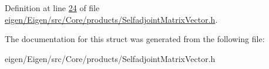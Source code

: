 Definition at line \hyperlink{eigen_2_eigen_2src_2_core_2products_2_selfadjoint_matrix_vector_8h_source_l00024}{24} of file \hyperlink{eigen_2_eigen_2src_2_core_2products_2_selfadjoint_matrix_vector_8h_source}{eigen/\+Eigen/src/\+Core/products/\+Selfadjoint\+Matrix\+Vector.\+h}.



The documentation for this struct was generated from the following file\+:\begin{DoxyCompactItemize}
\item 
eigen/\+Eigen/src/\+Core/products/\+Selfadjoint\+Matrix\+Vector.\+h\end{DoxyCompactItemize}
